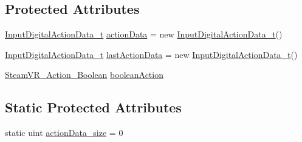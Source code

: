 \subsection*{Protected Attributes}
\begin{DoxyCompactItemize}
\item 
\mbox{\hyperlink{struct_valve_1_1_v_r_1_1_input_digital_action_data__t}{Input\+Digital\+Action\+Data\+\_\+t}} \mbox{\hyperlink{class_valve_1_1_v_r_1_1_steam_v_r___action___boolean___source_a548a08fed0cbd805a41b5c8fb6781ec7}{action\+Data}} = new \mbox{\hyperlink{struct_valve_1_1_v_r_1_1_input_digital_action_data__t}{Input\+Digital\+Action\+Data\+\_\+t}}()
\item 
\mbox{\hyperlink{struct_valve_1_1_v_r_1_1_input_digital_action_data__t}{Input\+Digital\+Action\+Data\+\_\+t}} \mbox{\hyperlink{class_valve_1_1_v_r_1_1_steam_v_r___action___boolean___source_a8da087502c6d74720661c51b921ebb3b}{last\+Action\+Data}} = new \mbox{\hyperlink{struct_valve_1_1_v_r_1_1_input_digital_action_data__t}{Input\+Digital\+Action\+Data\+\_\+t}}()
\item 
\mbox{\hyperlink{class_valve_1_1_v_r_1_1_steam_v_r___action___boolean}{Steam\+V\+R\+\_\+\+Action\+\_\+\+Boolean}} \mbox{\hyperlink{class_valve_1_1_v_r_1_1_steam_v_r___action___boolean___source_ab06d75d32615dfe0b2028e3e3b4d978d}{boolean\+Action}}
\end{DoxyCompactItemize}
\subsection*{Static Protected Attributes}
\begin{DoxyCompactItemize}
\item 
static uint \mbox{\hyperlink{class_valve_1_1_v_r_1_1_steam_v_r___action___boolean___source_ab45da73ac3ff33090639d347dbbe12bf}{action\+Data\+\_\+size}} = 0
\end{DoxyCompactItemize}
